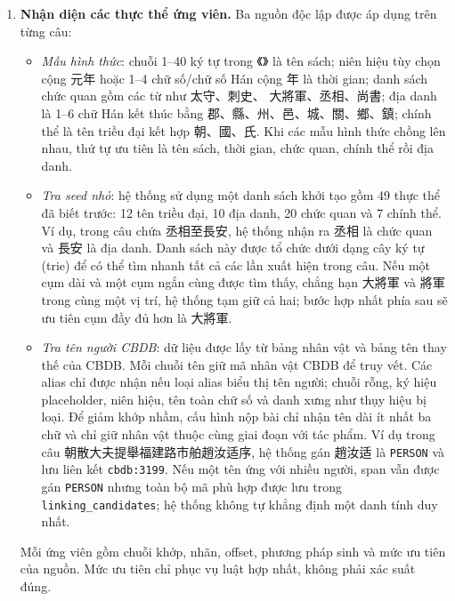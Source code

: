 \documentclass[11pt,a4paper]{article}
\newcommand{\han}[1]{{\hanfont #1}}
\begin{document}
\begin{enumerate}
  \item \textbf{Nhận diện các thực thể ứng viên.} Ba nguồn độc lập được
  áp dụng trên từng câu:
  \begin{itemize}
    \item \emph{Mẫu hình thức}: chuỗi 1--40 ký tự trong \han{《》} là tên sách;
    niên hiệu tùy chọn cộng \han{元年} hoặc 1--4 chữ số/chữ số Hán cộng
    \han{年} là thời gian; danh sách chức quan gồm các từ như \han{太守、刺史、
    大將軍、丞相、尚書}; địa danh là 1--6 chữ Hán kết thúc bằng
    \han{郡、縣、州、邑、城、關、鄉、鎮}; chính thể là tên triều đại kết hợp
    \han{朝、國、氏}. Khi các mẫu hình thức chồng lên nhau, thứ tự ưu tiên là
    tên sách, thời gian, chức quan, chính thể rồi địa danh.
    \item \emph{Tra seed nhỏ}: hệ thống sử dụng một danh sách khởi tạo gồm 49
    thực thể đã biết trước: 12 tên triều đại, 10 địa danh, 20 chức quan và 7
    chính thể. Ví dụ, trong câu chứa \han{丞相至長安}, hệ thống nhận ra
    \han{丞相} là chức quan và \han{長安} là địa danh. Danh sách này được tổ chức
    dưới dạng cây ký tự (trie) để có thể tìm nhanh tất cả các lần xuất hiện
    trong câu. Nếu một cụm dài và một cụm ngắn cùng được tìm thấy, chẳng hạn
    \han{大將軍} và \han{將軍} trong cùng một vị trí, hệ thống tạm giữ cả hai;
    bước hợp nhất phía sau sẽ ưu tiên cụm đầy đủ hơn là \han{大將軍}.
    \item \emph{Tra tên người CBDB}: dữ liệu được lấy từ bảng nhân vật và bảng
    tên thay thế của CBDB. Mỗi chuỗi tên giữ mã nhân vật CBDB để truy vết. Các
    alias chỉ được nhận nếu loại alias biểu thị tên người; chuỗi rỗng, ký hiệu
    placeholder, niên hiệu, tên toàn chữ số và danh xưng như thụy hiệu bị loại.
    Để giảm khớp nhầm, cấu hình nộp bài chỉ nhận tên dài ít nhất ba chữ và chỉ
    giữ nhân vật thuộc cùng giai đoạn với tác phẩm. Ví dụ trong câu
    \han{朝散大夫提舉福建路市舶趙汝适序}, hệ thống gán \han{趙汝适} là
    \texttt{PERSON} và lưu liên kết \texttt{cbdb:3199}. Nếu một tên ứng với
    nhiều người, span vẫn được gán \texttt{PERSON} nhưng toàn bộ mã phù hợp
    được lưu trong \texttt{linking\_candidates}; hệ thống không tự khẳng định
    một danh tính duy nhất.
  \end{itemize}
  Mỗi ứng viên gồm chuỗi khớp, nhãn, offset, phương pháp sinh và mức ưu tiên
  của nguồn. Mức ưu tiên chỉ phục vụ luật hợp nhất, không phải xác suất đúng.


\end{enumerate}
\end{document}
